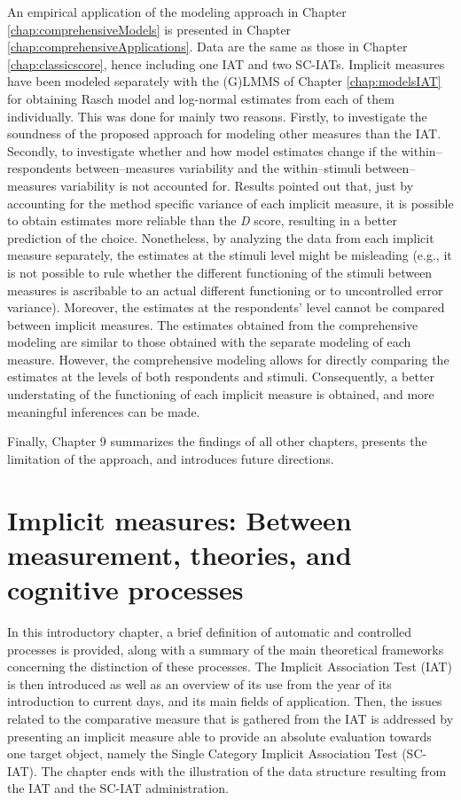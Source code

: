 \documentclass[12pt]{book}
\begin{document}
An empirical application of the modeling approach in Chapter \ref{chap:comprehensiveModels} is presented in Chapter \ref{chap:comprehensiveApplications}. Data are the same as those in Chapter \ref{chap:classicscore}, hence including one IAT and two SC-IATs. 
Implicit measures have been modeled separately with the (G)LMMS of Chapter \ref{chap:modelsIAT} for obtaining Rasch model and log-normal estimates from each of them individually. This was done for mainly two reasons. Firstly, to investigate the soundness of the proposed approach for modeling other measures than the IAT. Secondly, to investigate whether and how model estimates change if the within--respondents between--measures variability and the within--stimuli between--measures variability is not accounted for. 
Results pointed out that, just by accounting for the method specific variance of each implicit measure, it is possible to obtain estimates more reliable than the \emph{D} score, resulting in a better prediction of the choice. 
Nonetheless, by analyzing the data from each implicit measure separately, the estimates at the stimuli level might be misleading (e.g., it is not possible to rule whether the different functioning of the stimuli between measures is ascribable to an actual different functioning or to uncontrolled error variance). 
Moreover, the estimates at the respondents' level cannot be compared between implicit measures.
The estimates obtained from the comprehensive modeling are similar to those obtained with the separate modeling of each measure. However, the comprehensive modeling allows for directly comparing the estimates at the levels of both respondents and stimuli. Consequently, a better understating of the functioning of each implicit measure is obtained, and more meaningful inferences can be made.  

Finally, Chapter 9 summarizes the findings of all other chapters, presents the limitation of the approach, and introduces future directions.

\newpage

\mainmatter
\thispagestyle{empty}
\chapter[Theories, Processes, Measurement]{Implicit measures: Between measurement, theories, and cognitive processes}

In this introductory chapter, a brief definition of automatic and controlled processes is provided, along with a summary of the main theoretical frameworks concerning the distinction of these processes. The Implicit Association Test (IAT) is then introduced as well as an overview of its use from the year of its introduction to current days, and its main fields of application. Then, the issues related to the comparative measure that is gathered from the IAT is addressed by presenting an implicit measure able to provide an absolute evaluation towards one target object, namely the Single Category Implicit Association Test (SC-IAT). The chapter ends with the illustration of the data structure resulting from the IAT and the SC-IAT administration.
\end{document}
